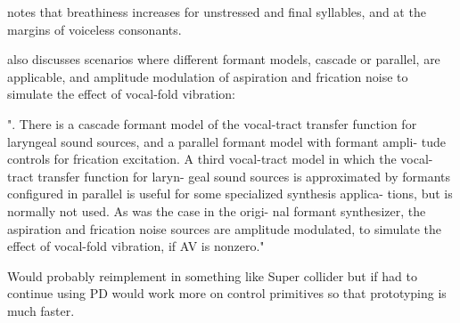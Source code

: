\cite{Klatt1990} notes that breathiness increases for unstressed  and final syllables, and at the margins of voiceless consonants.

\cite{Klatt1990} also discusses scenarios where different formant models, cascade or parallel, are applicable, and amplitude modulation of aspiration and frication noise to simulate the effect of vocal-fold vibration:

".
There is a cascade formant model
of the vocal-tract transfer function for laryngeal sound sources,
and a parallel formant model with formant ampli-
tude controls for frication excitation.
A third vocal-tract
model in which the vocal-tract transfer function for laryn- geal sound sources
is approximated by formants
configured
in parallel is useful for some specialized
synthesis
applica-
tions, but is normally not used.
As was the case in the origi-
nal formant synthesizer,
the aspiration and frication noise
sources are amplitude modulated, to simulate the effect of vocal-fold vibration, if AV is nonzero."

Would probably reimplement in something like Super collider but if had to continue using PD would work more on control primitives so that prototyping is much faster.
